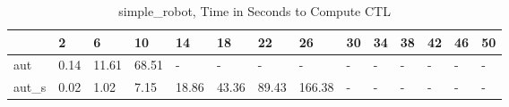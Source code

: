 \begin{table}
\caption{simple_robot, Time in Seconds to Compute CTL}
\label{simple_robot_CTL_time}
\begin{tabular}{llllllllllllll}
\toprule
 & 2 & 6 & 10 & 14 & 18 & 22 & 26 & 30 & 34 & 38 & 42 & 46 & 50 \\
\midrule
aut & 0.14 & 11.61 & 68.51 & - & - & - & - & - & - & - & - & - & - \\
aut_s & 0.02 & 1.02 & 7.15 & 18.86 & 43.36 & 89.43 & 166.38 & - & - & - & - & - & - \\
\bottomrule
\end{tabular}
\end{table}
